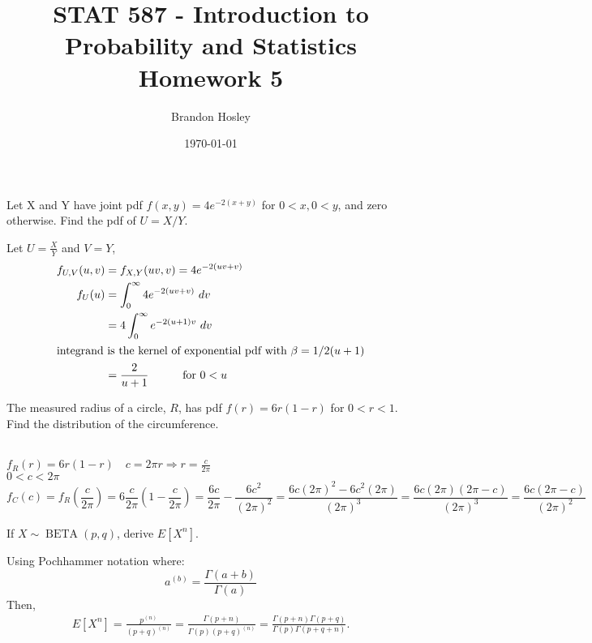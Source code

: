 \documentclass[answers]{exam}
\title{STAT 587 - Introduction to Probability and Statistics%
	\\ Homework 5}
\author{Brandon Hosley}
\date{\today}
\begin{document}
\maketitle
\begin{questions}

\question 
Let X and Y have joint pdf \(f(x,y)=4e^{-2(x+y)}\) for \(0<x,0<y\), and zero otherwise. 
Find the pdf of \(U=X/Y\).
\begin{solution}
	Let \(U = \frac{X}{Y}\) and \(V=Y\),
	\begin{align*}
		f_{U,V}(u,v) &= f_{X,Y}(uv,v) = 4e^{-2(uv+v)} \\
		f_U(u) &= \int_{0}^{\infty} 4e^{-2(uv+v)} \ dv \\
		&= 4 \int_{0}^{\infty} e^{-2(u+1)v} \ dv \\
		\intertext{integrand is the kernel of exponential pdf with $\beta=1/2(u+1)$} 
		&= \frac{2}{u+1} \hspace{3em}\text{for }0<u
	\end{align*}
\end{solution}

\question 
The measured radius of a circle, \(R\), has pdf \(f(r)=6r(1-r)\) for \(0<r<1\). 
Find the distribution of the circumference.
\begin{solution} \\
	\(f_R(r)=6r(1-r) \quad c=2\pi r \Rightarrow r=\frac{c}{2\pi}\) \\ 
	\(0 < c < 2\pi\)
	\[f_C(c) 
	= f_R(\frac{c}{2\pi})
	= 6\frac{c}{2\pi}(1-\frac{c}{2\pi})
	= \frac{6c}{2\pi}-\frac{6c^2}{(2\pi)^2}
	= \frac{6c(2\pi)^2-6c^2(2\pi)}{(2\pi)^3}
	= \frac{6c(2\pi)(2\pi-c)}{(2\pi)^3}
	= \frac{6c(2\pi-c)}{(2\pi)^2}
	\]
	
\end{solution}

\question 
If \(X \sim \operatorname{BETA}(p,q)\), derive \(E[X^n]\).
\begin{solution}
	Using Pochhammer notation where:
	\[ a^{(b)} = \frac{\Gamma(a+b)}{\Gamma(a)}\]
	Then,
	\begin{align*}
		E[X^n]
		= \frac{p^{(n)}}{(p+q)^{(n)}}
		= \frac{\Gamma(p+n)}{\Gamma(p)(p+q)^{(n)}}
		= \frac{\Gamma(p+n)\Gamma(p+q)}{\Gamma(p)\Gamma(p+q+n)}.
	\end{align*}
\end{solution}


\end{questions}
\end{document}

